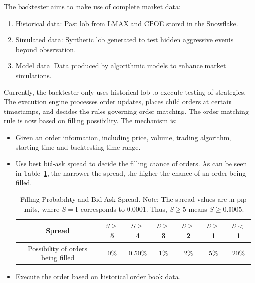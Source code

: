 The backtester aims to make use of complete market data:
\begin{enumerate}
    \item Historical data: Past \gls{lob} from LMAX and CBOE stored in the Snowflake.
    \item Simulated data: Synthetic \gls{lob} generated to test hidden aggressive events beyond observation.
    \item Model data: Data produced by algorithmic models to enhance market simulations.
\end{enumerate}
Currently, the backtester only uses historical \gls{lob} to execute testing of strategies. The execution engine processes order updates, places child orders at certain timestamps, and decides the rules governing order matching. The order matching rule is now based on filling possibility. The mechanism is:
\begin{itemize}
    \item Given an order information, including price, volume, trading algorithm, starting time and backtesting time range.
    \item Use best bid-ask spread to decide the filling chance of orders. As can be seen in Table~\ref{tab:filling_spread}, the narrower the spread, the higher the chance of an order being filled.
    \begin{table}[h]
        \centering
        \begin{tabular}{c|c|c|c|c|c|c}
            \hline
            Spread & $S \geq$ 5 & $S \geq$ 4 & $S \geq$ 3 & $S \geq$ 2 & $S \geq$ 1 & $S <$ 1 \\
            \hline
            Possibility of orders being filled & 0\% & 0.50\% & 1\% & 2\% & 5\% & 20\% \\
            \hline
        \end{tabular}
        \caption{Filling Probability and Bid-Ask Spread. Note: The spread values are in pip units, where $S=1$ corresponds to $0.0001$. Thus, $S \geq 5$ means $S \geq 0.0005$.}
        \label{tab:filling_spread}
    \end{table}
    \item Execute the order based on historical order book data.
\end{itemize} 


